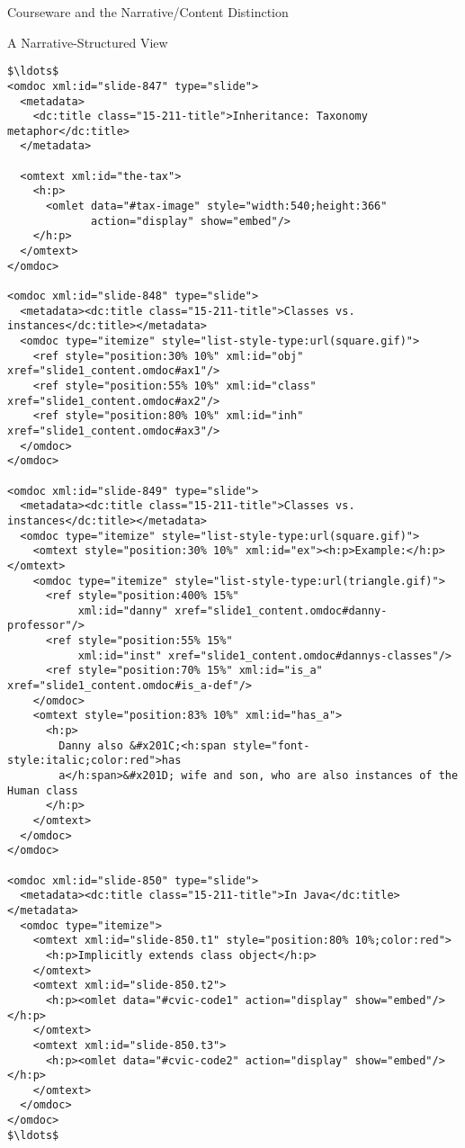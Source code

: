 \begin{omgroup}[id=courseware]{Courseware and the Narrative/Content Distinction}
\begin{omgroup}[id=courseware.narrative-structured]{A Narrative-Structured View}
\begin{lstlisting}[label=lst:ann-narrative,mathescape,
    caption={The Narrative {\omdoc}  for {\myfigref{15-211}}},
    index={omdoc,omtext,h:p,metadata,dc:title,ref}]
$\ldots$
<omdoc xml:id="slide-847" type="slide">
  <metadata>
    <dc:title class="15-211-title">Inheritance: Taxonomy metaphor</dc:title>
  </metadata>
  
  <omtext xml:id="the-tax">
    <h:p>
      <omlet data="#tax-image" style="width:540;height:366" 
             action="display" show="embed"/>
    </h:p>
  </omtext>
</omdoc>

<omdoc xml:id="slide-848" type="slide">
  <metadata><dc:title class="15-211-title">Classes vs. instances</dc:title></metadata>
  <omdoc type="itemize" style="list-style-type:url(square.gif)">
    <ref style="position:30% 10%" xml:id="obj" xref="slide1_content.omdoc#ax1"/>
    <ref style="position:55% 10%" xml:id="class" xref="slide1_content.omdoc#ax2"/>
    <ref style="position:80% 10%" xml:id="inh" xref="slide1_content.omdoc#ax3"/>
  </omdoc>
</omdoc>

<omdoc xml:id="slide-849" type="slide">
  <metadata><dc:title class="15-211-title">Classes vs. instances</dc:title></metadata>
  <omdoc type="itemize" style="list-style-type:url(square.gif)">
    <omtext style="position:30% 10%" xml:id="ex"><h:p>Example:</h:p></omtext>
    <omdoc type="itemize" style="list-style-type:url(triangle.gif)">
      <ref style="position:400% 15%" 
           xml:id="danny" xref="slide1_content.omdoc#danny-professor"/>
      <ref style="position:55% 15%" 
           xml:id="inst" xref="slide1_content.omdoc#dannys-classes"/>
      <ref style="position:70% 15%" xml:id="is_a" xref="slide1_content.omdoc#is_a-def"/>
    </omdoc>
    <omtext style="position:83% 10%" xml:id="has_a">
      <h:p>
        Danny also &#x201C;<h:span style="font-style:italic;color:red">has
        a</h:span>&#x201D; wife and son, who are also instances of the Human class
      </h:p>
    </omtext>
  </omdoc>
</omdoc>

<omdoc xml:id="slide-850" type="slide">
  <metadata><dc:title class="15-211-title">In Java</dc:title></metadata>
  <omdoc type="itemize">
    <omtext xml:id="slide-850.t1" style="position:80% 10%;color:red">
      <h:p>Implicitly extends class object</h:p>
    </omtext>
    <omtext xml:id="slide-850.t2">
      <h:p><omlet data="#cvic-code1" action="display" show="embed"/></h:p>
    </omtext>
    <omtext xml:id="slide-850.t3">
      <h:p><omlet data="#cvic-code2" action="display" show="embed"/></h:p>  
    </omtext>
  </omdoc>
</omdoc>
$\ldots$
\end{lstlisting}
\end{omgroup}



\end{omgroup}

